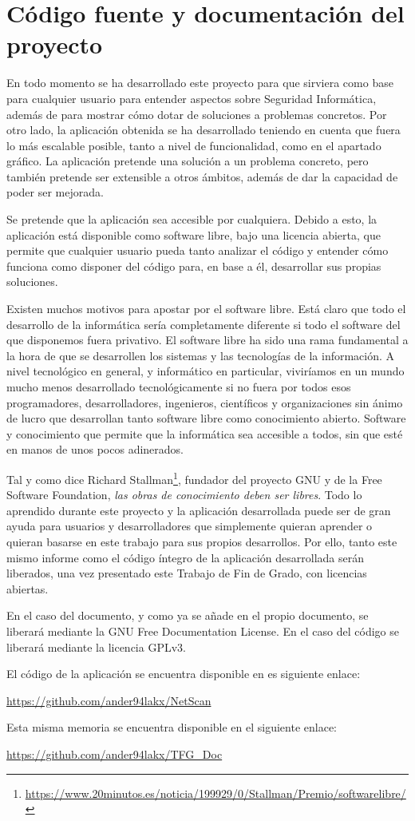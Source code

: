\chapter{Código fuente y documentación del proyecto}

En todo momento se ha desarrollado este proyecto para que sirviera como base para cualquier usuario para entender aspectos sobre Seguridad Informática, además de para mostrar cómo dotar de soluciones a problemas concretos. Por otro lado, la aplicación obtenida se ha desarrollado teniendo en cuenta que fuera lo más escalable posible, tanto a nivel de funcionalidad, como en el apartado gráfico. La aplicación pretende una solución a un problema concreto, pero también pretende ser extensible a otros ámbitos, además de dar la capacidad de poder ser mejorada.

Se pretende que la aplicación sea accesible por cualquiera. Debido a esto, la aplicación está disponible como software libre, bajo una licencia abierta, que permite que cualquier usuario pueda tanto analizar el código y entender cómo funciona como disponer del código para, en base a él, desarrollar sus propias soluciones.

Existen muchos motivos para apostar por el software libre. Está claro que todo el desarrollo de la informática sería completamente diferente si todo el software del que disponemos fuera privativo. El software libre ha sido una rama fundamental a la hora de que se desarrollen los sistemas y las tecnologías de la información. A nivel tecnológico en general, y informático en particular, viviríamos en un mundo mucho menos desarrollado tecnológicamente si no fuera por todos esos programadores, desarrolladores, ingenieros, científicos y organizaciones sin ánimo de lucro que desarrollan tanto software libre como conocimiento abierto. Software y conocimiento que permite que la informática sea accesible a todos, sin que esté en manos de unos pocos adinerados.

Tal y como dice Richard Stallman\footnote{\url{https://www.20minutos.es/noticia/199929/0/Stallman/Premio/softwarelibre/}},  fundador del proyecto GNU y de la Free Software Foundation, \textit{las obras de conocimiento deben ser libres}. Todo lo aprendido durante este proyecto y la aplicación desarrollada puede ser de gran ayuda para usuarios y desarrolladores que simplemente quieran aprender o quieran basarse en este trabajo para sus propios desarrollos. Por ello, tanto este mismo informe como el código íntegro de la aplicación desarrollada serán liberados, una vez presentado este Trabajo de Fin de Grado, con licencias abiertas.

En el caso del documento, y como ya se añade en el propio documento, se liberará mediante la GNU Free Documentation License. En el caso del código se liberará mediante la licencia GPLv3.

El código de la aplicación se encuentra disponible en es siguiente enlace:

\url{https://github.com/ander94lakx/NetScan}

Esta misma memoria se encuentra disponible en el siguiente enlace: 

\url{https://github.com/ander94lakx/TFG_Doc}

